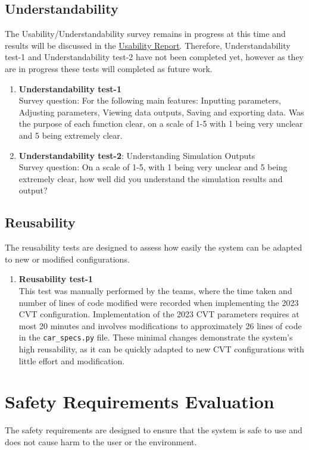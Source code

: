 \documentclass[12pt, titlepage]{article}
\begin{document}
\subsection{Understandability}
The Usability/Understandability survey remains in progress at this time and results will be discussed in the \href{file:../UsabilityReport/UsabilityReport.pdf}{Usability Report}. 
Therefore, Understandability test-1 and Understandability test-2 have not been completed yet, however as they are in progress these tests will completed as future work. 

\begin{enumerate}
  \item{\textbf{Understandability test-1}}\\
  Survey question: For the following main features: Inputting parameters, Adjusting parameters, Viewing data outputs, Saving and exporting data. 
  Was the purpose of each function clear, on a scale of 1-5 with 1 being very unclear and 5 being extremely clear. 
  \item{\textbf{Understandability test-2}: Understanding Simulation Outputs}\\
  Survey question: On a scale of 1-5, with 1 being very unclear and 5 being extremely clear, how well did you understand the simulation results and output?
\end{enumerate}

\subsection{Reusability}

The reusability tests are designed to assess how easily the system can be adapted to new or modified configurations. 
\begin{enumerate}
    \item {\textbf{Reusability test-1}}\\
    This test was manually performed by the teams, where the time taken and number of lines of code modified were recorded when implementing the 2023 CVT configuration. 
    Implementation of the 2023 CVT parameters requires at most 20 minutes and involves modifications to approximately 26 lines of code in the \texttt{car\_specs.py} file. 
    These minimal changes demonstrate the system's high reusability, as it can be quickly adapted to new CVT configurations with little effort and modification.
\end{enumerate}
	
\section{Safety Requirements Evaluation}
The safety requirements are designed to ensure that the system is safe to use and does not cause harm to the user or the environment.
\end{document}
